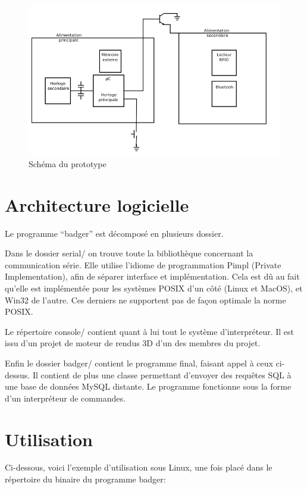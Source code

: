     \begin{figure}[h]
        \begin{center}
            \includegraphics[scale=0.7]{images/protoSchema.png} 
        \end{center}
        \caption{Schéma du prototype}
        \label{Schéma du prototype}
     \end{figure} 


    \section{Architecture logicielle}
Le programme ``badger'' est décomposé en plusieurs dossier. 

Dans le dossier serial/ on trouve toute la bibliothèque concernant la communication
série. Elle utilise l'idiome de programmation Pimpl (Private Implementation), afin 
de séparer interface et implémentation. Cela est dû au fait qu'elle est implémentée
pour les systèmes POSIX d'un côté (Linux et MacOS), et Win32 de l'autre. Ces derniers
ne supportent pas de façon optimale la norme POSIX.

Le répertoire console/ contient quant à lui tout le système d'interpréteur.
Il est issu d'un projet de moteur de rendus 3D d'un des membres du projet.

Enfin le dossier badger/ contient le programme final, faisant appel à ceux
ci-dessus. Il contient de plus une classe permettant d'envoyer des requêtes SQL
à une base de données MySQL distante. Le programme fonctionne sous la forme d'un 
interpréteur de commandes.


    \section{Utilisation}
Ci-dessous, voici l'exemple d'utilisation sous Linux, une fois placé dans le
répertoire du binaire du programme badger:

